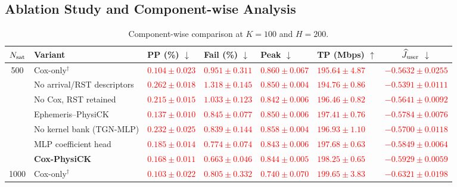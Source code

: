 \documentclass[10pt,letterpaper,journal]{IEEEtran}
\newcommand{\revnew}[1]{\textcolor{red}{#1}}
\begin{document}
\subsection{Ablation Study and Component-wise Analysis}
\label{sec:ablation}

\begin{table}[t]
\centering
\caption{Component-wise comparison at $K=100$ and $H=200$.}
\label{tab:ablation}
\footnotesize
\renewcommand{\arraystretch}{1.10}
\setlength{\tabcolsep}{2.5pt}
\begin{tabularx}{\textwidth}{@{}c >{\raggedright\arraybackslash}p{}*{4}{>{\centering\arraybackslash}X} c@{}}
\toprule
$N_{\rm sat}$ & Variant & PP (\%) $\downarrow$ & Fail (\%) $\downarrow$ & Peak $\downarrow$ & \makecell{TP\\(Mbps) $\uparrow$} & $\widehat J_{\rm user}$ $\downarrow$ \\
\midrule
500 & Cox-only$^{\dagger}$ & \revnew{$0.104\pm0.023$} & \revnew{$0.951\pm0.311$} & \revnew{$0.860\pm0.067$} & \revnew{$195.64\pm4.87$} & \revnew{$-0.5632\pm0.0255$} \\
 & No arrival/RST descriptors & \revnew{$0.262\pm0.018$} & \revnew{$1.318\pm0.145$} & \revnew{$0.850\pm0.004$} & \revnew{$194.76\pm0.86$} & \revnew{$-0.5391\pm0.0111$} \\
 & No Cox, RST retained & \revnew{$0.215\pm0.015$} & \revnew{$1.033\pm0.123$} & \revnew{$0.842\pm0.006$} & \revnew{$196.46\pm0.82$} & \revnew{$-0.5641\pm0.0092$} \\
 & Ephemeris--PhysiCK & \revnew{$0.137\pm0.010$} & \revnew{$0.845\pm0.077$} & \revnew{$0.850\pm0.006$} & \revnew{$197.41\pm0.76$} & \revnew{$-0.5784\pm0.0076$} \\
 & No kernel bank (TGN-MLP) & \revnew{$0.232\pm0.025$} & \revnew{$0.839\pm0.144$} & \revnew{$0.858\pm0.004$} & \revnew{$196.93\pm1.10$} & \revnew{$-0.5700\pm0.0118$} \\
 & MLP coefficient head & \revnew{$0.185\pm0.014$} & \revnew{$0.774\pm0.074$} & \revnew{$0.843\pm0.006$} & \revnew{$197.68\pm0.63$} & \revnew{$-0.5849\pm0.0064$} \\
 & \textbf{Cox-PhysiCK} & \revnew{$0.168\pm0.011$} & \revnew{$0.663\pm0.046$} & \revnew{$0.844\pm0.005$} & \revnew{$198.25\pm0.65$} & \revnew{$-0.5929\pm0.0059$} \\
\midrule
1000 & Cox-only$^{\dagger}$ & \revnew{$0.103\pm0.022$} & \revnew{$0.805\pm0.332$} & \revnew{$0.740\pm0.070$} & \revnew{$199.65\pm3.83$} & \revnew{$-0.6321\pm0.0198$} \\

\end{tabularx}
\end{table}
\end{document}
